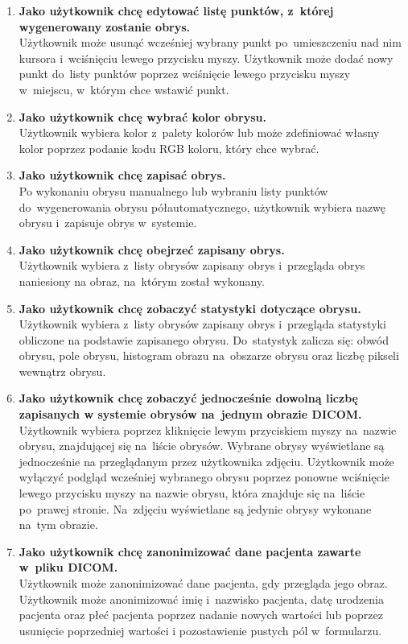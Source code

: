 \documentclass[a4paper,11pt,twoside,openright]{report}
\theoremstyle{definition}
\begin{document}
\begin{enumerate}
\item \textbf {Jako użytkownik chcę edytować listę punktów, z~której wygenerowany zostanie obrys.} \\
Użytkownik może usunąć wcześniej wybrany punkt po~umieszczeniu nad nim kursora i~wciśnięciu
lewego przycisku myszy. Użytkownik może dodać nowy punkt do~listy punktów
poprzez wciśnięcie lewego przycisku myszy w~miejscu, w~którym chce wstawić punkt.

\item \textbf {Jako użytkownik chcę wybrać kolor obrysu.} \\
Użytkownik wybiera kolor z~palety kolorów lub może zdefiniować własny kolor poprzez
podanie kodu RGB koloru, który chce wybrać.

\item \textbf {Jako użytkownik chcę zapisać obrys.} \\
Po wykonaniu obrysu manualnego lub wybraniu listy punktów do~wygenerowania obrysu
półautomatycznego, użytkownik wybiera nazwę obrysu i~zapisuje obrys w~systemie.

\item \textbf {Jako użytkownik chcę obejrzeć zapisany obrys.} \\
Użytkownik wybiera z~listy obrysów zapisany obrys i~przegląda obrys naniesiony
na obraz, na~którym został wykonany.

\item \textbf {Jako użytkownik chcę zobaczyć statystyki dotyczące obrysu.} \\
Użytkownik wybiera z~listy obrysów zapisany obrys i~przegląda statystyki obliczone
na podstawie zapisanego obrysu. Do~statystyk zalicza się: obwód obrysu, pole obrysu,
histogram obrazu na~obszarze obrysu oraz liczbę pikseli wewnątrz obrysu.

\item \textbf {Jako użytkownik chcę zobaczyć jednocześnie dowolną liczbę zapisanych
w systemie obrysów na~jednym obrazie DICOM.} \\
Użytkownik wybiera poprzez kliknięcie lewym przyciskiem myszy na~nazwie obrysu,
znajdującej się na~liście obrysów. Wybrane obrysy wyświetlane są jednocześnie
na przeglądanym przez użytkownika zdjęciu. Użytkownik może wyłączyć podgląd
wcześniej wybranego obrysu poprzez ponowne wciśnięcie lewego przycisku myszy
na nazwie obrysu, która znajduje się na~liście po~prawej stronie. Na~zdjęciu wyświetlane są jedynie
obrysy wykonane na~tym obrazie.

\item \textbf {Jako użytkownik chcę zanonimizować dane pacjenta zawarte w~pliku DICOM.} \\
Użytkownik może zanonimizować dane pacjenta, gdy przegląda jego obraz. Użytkownik może
anonimizować imię i~nazwisko pacjenta, datę urodzenia pacjenta oraz płeć pacjenta
poprzez nadanie nowych wartości lub poprzez usunięcie poprzedniej wartości i
pozostawienie pustych pól w~formularzu.

\end{enumerate}
\end{document}

